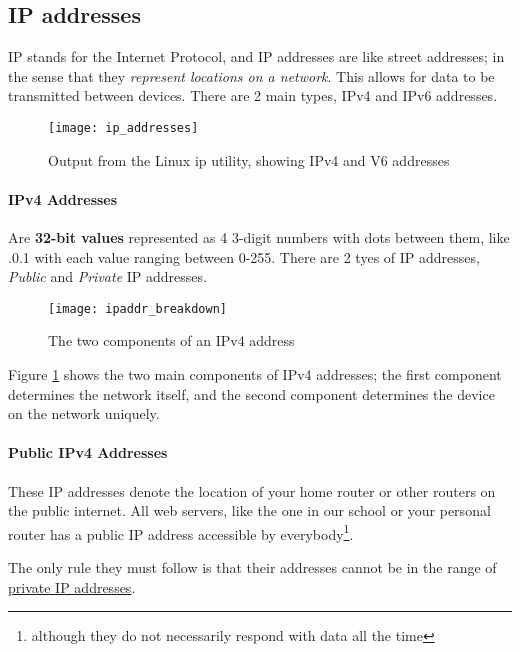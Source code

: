 \documentclass[../main.tex]{subfiles}
\begin{document}
\subsection{IP addresses}
\label{2:sec:ip}

IP stands for the Internet Protocol, and IP addresses are like street addresses; in the sense that they \emph{represent locations on a network}. This allows for data to be transmitted between devices. There are 2 main types, IPv4 and IPv6 addresses.

\begin{figure}[h]
    \centering
    \texttt{[image: ip\_addresses]}
    \caption{Output from the Linux {\ccmono ip} utility, showing IPv4 and V6 addresses}
\end{figure}

\paragraph{IPv4 Addresses}

Are \textbf{32-bit values} represented as 4 3-digit numbers with dots between them, like {.0.1} with each value ranging between 0-255. There are 2 tyes of IP addresses, \emph{Public} and \emph{Private} IP addresses.

\begin{figure}[h]
    \centering
    \texttt{[image: ipaddr\_breakdown]}
    \caption{The two components of an IPv4 address}
    \label{fig:ipaddr_breakdown}
\end{figure}

Figure \ref{fig:ipaddr_breakdown} shows the two main components of IPv4 addresses; the first component determines the network itself, and the second component determines the device on the network uniquely.

\paragraph{Public IPv4 Addresses}

These IP addresses denote the location of your home router or other routers on the public internet. All web servers, like the one in our school or your personal router has a public IP address accessible by everybody\footnote{although they do not necessarily respond with data all the time}.

The only rule they must follow is that their addresses cannot be in the range of \hyperref[tab:private_ip_classes]{private IP addresses}.
\end{document}
